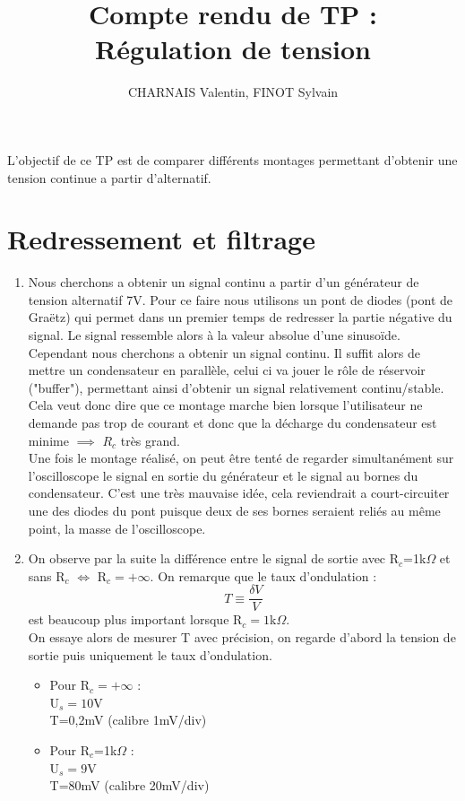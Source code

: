 \documentclass[12pt,a4paper]{article}
\author{CHARNAIS Valentin, FINOT Sylvain}
\title{Compte rendu de TP : \\ Régulation de tension}
\begin{document}
\maketitle
L'objectif de ce TP est de comparer différents montages permettant d'obtenir une tension continue a partir d'alternatif.
\section{Redressement et filtrage}
\begin{enumerate}
\item Nous cherchons a obtenir un signal continu a partir d'un générateur de tension alternatif 7V. Pour ce faire nous utilisons un pont de diodes (pont de Graëtz) qui permet dans un premier temps de redresser la partie négative du signal. Le signal ressemble alors à la valeur absolue d'une sinusoïde. Cependant nous cherchons a obtenir un signal continu. Il suffit alors de mettre un condensateur en parallèle, celui ci va jouer le rôle de réservoir ("buffer"), permettant ainsi d'obtenir un signal relativement continu/stable. Cela veut donc dire que ce montage marche bien lorsque l'utilisateur ne demande pas trop de courant et donc que la décharge du condensateur est minime $\implies$ $R_{c}$ très grand.\\
Une fois le montage réalisé, on peut être tenté de regarder simultanément sur l'oscilloscope le signal en sortie du générateur et le signal au bornes du condensateur. C'est une très mauvaise idée, cela reviendrait a court-circuiter une des diodes du pont puisque deux de ses bornes seraient reliés au même point, la masse de l'oscilloscope.

\item On observe par la suite la différence entre le signal de sortie avec R$_{c}$=1k$\Omega$ et sans R$_{c}$ $\iff$ R$_{c}=+ \infty$. On remarque que le taux d'ondulation : \[T\equiv \dfrac{\delta V}{V} \] est beaucoup plus important lorsque R$_{c}=1$k$\Omega$. \\
On essaye alors de mesurer T avec précision, on regarde d'abord la tension de sortie puis uniquement le taux d'ondulation.
\begin{multicols}{2}
\begin{itemize}
\item Pour R$_{c}=+ \infty$ :\\
U$_{s}=10$V \\
T=0,2mV (calibre 1mV/div)
\item Pour R$_{c}$=1k$\Omega$ : \\
U$_{s}=9$V\\
T=80mV (calibre 20mV/div)
\end{itemize}
\end{multicols}
\end{enumerate}
\end{document}

